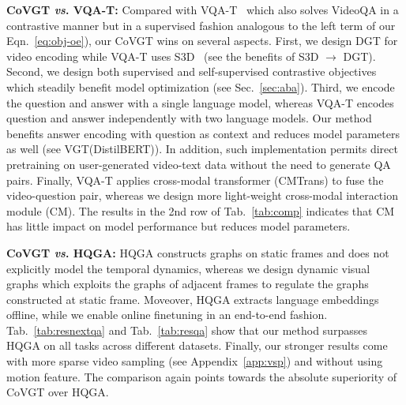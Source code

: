 \documentclass[10pt,journal,compsoc]{IEEEtran}
\newcommand{\vs}{\textit{vs}. }
\begin{document}
\textbf{CoVGT \vs VQA-T:}
Compared with VQA-T~\cite{yang2021just} which also solves VideoQA in a contrastive manner but in a supervised fashion analogous to the left term of our Eqn.~\eqref{eq:obj-oe}), our CoVGT wins on several aspects. First, we design DGT for video encoding while VQA-T uses S3D~\cite{xie2018rethinking,miech2020end} (see the benefits of S3D $\rightarrow$ DGT). Second, we design both supervised and self-supervised contrastive objectives which steadily benefit model optimization (see Sec.~\ref{sec:aba}). Third, we encode the question and answer with a single language model, whereas VQA-T encodes question and answer independently with two language models. Our method benefits answer encoding with question as context and reduces model parameters as well (see VGT(DistilBERT)). In addition, such implementation 
permits direct pretraining on user-generated video-text data without the need to generate QA pairs. Finally, VQA-T applies cross-modal transformer (CMTrans) to fuse the video-question pair, whereas we design more light-weight cross-modal interaction module (CM). The results in the 2nd row of Tab.~\ref{tab:comp} indicates that CM has little impact on model performance but reduces model parameters.
\setlength{\tabcolsep}{7pt}
\begin{table}[t!]
    \small
    \centering
    \caption{Detailed comparison between VGT and VQA-T~\cite{Yang_2021_ICCV}. CMTrans: cross-modal transformer.
    }
    \vspace{-0.5em}
    \vspace{-0.4cm}
    \label{tab:comp}
\end{table}

\textbf{CoVGT \vs HQGA:} HQGA \cite{xiao2022video} constructs graphs on static frames and does not explicitly model the temporal dynamics, whereas we design dynamic visual graphs which exploits the graphs of adjacent frames to regulate the graphs constructed at static frame. Moveover, HQGA extracts language embeddings offline, while we enable online finetuning in an end-to-end fashion. Tab.~\ref{tab:resnextqa} and Tab.~\ref{tab:resqa} show that our method surpasses HQGA on all tasks across different datasets. 
Finally, our stronger results come with more sparse video sampling (see Appendix~\ref{app:vsp}) and without using motion feature. The comparison again points towards the absolute superiority of CoVGT over HQGA.
\end{document}
